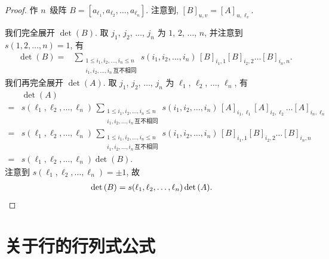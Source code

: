 \documentclass[%
    UTF8,%
    fontset=none,%
    punct=kaiming,%
    zihao=-4,%
    a4paper,%
    oneside,%
]{ctexbook}
\renewcommand*{\leq}{\leqslant}
\begin{document}
\begin{proof}
    作 \(n\)~级阵
    \(
    B = [a_{\ell_1}, a_{\ell_2}, \dots, a_{\ell_n}].
    \)
    注意到, \([B]_{u,v} = [A]_{u,\ell_v}\).

    我们完全展开 \(\det {(B)}\).
    取 \(j_1\), \(j_2\), \(\dots\), \(j_n\)
    为 \(1\), \(2\), \(\dots\), \(n\),
    并注意到 \(s(1, 2, \dots, n) = 1\),
    有
    \begin{align*}
        \det {(B)}
        = {} &
        \sum_{\substack{
        1 \leq i_1, i_2, \dots, i_n \leq n \\
                i_1, i_2, \dots, i_n\,\text{互不相同}
            }}
        {s(i_1, i_2, \dots, i_n)\,
            [B]_{i_1,1} [B]_{i_2,2}
            \dots [B]_{i_n,n}}.
    \end{align*}
    我们再完全展开 \(\det {(A)}\).
    取 \(j_1\), \(j_2\), \(\dots\), \(j_n\)
    为 \(\ell_1\), \(\ell_2\), \(\dots\), \(\ell_n\),
    有
    \begin{align*}
             & \det {(A)}
        \\
        = {} &
        s(\ell_1, \ell_2, \dots, \ell_n)\,
        \sum_{\substack{
        1 \leq i_1, i_2, \dots, i_n \leq n      \\
                i_1, i_2, \dots, i_n\,\text{互不相同}
            }}
        {s(i_1, i_2, \dots, i_n)\,
            [A]_{i_1,\ell_1} [A]_{i_2,\ell_2}
            \dots [A]_{i_n,\ell_n}}
        \\
        = {} &
        s(\ell_1, \ell_2, \dots, \ell_n)\,
        \sum_{\substack{
        1 \leq i_1, i_2, \dots, i_n \leq n      \\
                i_1, i_2, \dots, i_n\,\text{互不相同}
            }}
        {s(i_1, i_2, \dots, i_n)\,
            [B]_{i_1,1} [B]_{i_2,2}
            \dots [B]_{i_n,n}}
        \\
        = {} & s(\ell_1, \ell_2, \dots, \ell_n)
        \det {(B)}.
    \end{align*}
    注意到 \(s(\ell_1, \ell_2, \dots, \ell_n) = \pm 1\),
    故
    \begin{align*}
         & \det {(B)}
        = s(\ell_1, \ell_2, \dots, \ell_n)
        \det {(A)}.
        \qedhere
    \end{align*}
\end{proof}

\section{关于行的行列式公式}
\end{document}
